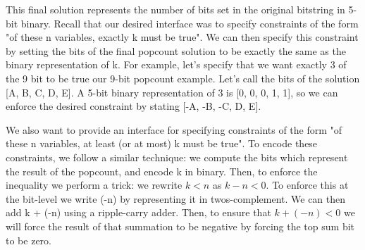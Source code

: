 This final solution represents the number of bits set in the original bitstring in 5-bit binary. Recall that our desired interface was to specify constraints of the form "of these n variables, exactly k must be true". We can then specify this constraint by setting the bits of the final popcount solution to be exactly the same as the binary representation of k. For example, let's specify that we want exactly 3 of the 9 bit to be true our 9-bit popcount example. Let's call the bits of the solution [A, B, C, D, E]. A 5-bit binary representation of 3 is [0, 0, 0, 1, 1], so we can enforce the desired constraint by stating [-A, -B, -C, D, E].

We also want to provide an interface for specifying constraints of the form "of these n variables, at least (or at most) k must be true". To encode these constraints, we follow a similar technique: we compute the bits which represent the result of the popcount, and encode k in binary. Then, to enforce the inequality we perform a trick: we rewrite $ k < n $ as $ k - n < 0$. To enforce this at the bit-level we write (-n) by representing it in twos-complement. We can then add k + (-n) using a ripple-carry adder. Then, to ensure that $k + (-n) < 0$ we will force the result of that summation to be negative by forcing the top sum bit to be zero.

